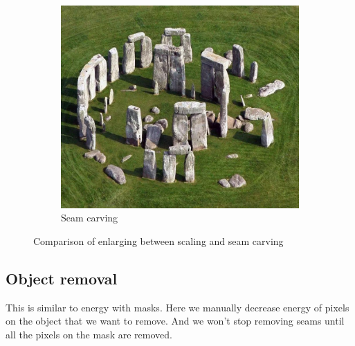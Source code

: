 \documentclass[final]{cvpr}
\begin{document}
\begin{figure}[htb]
\begin{center}
\begin{subfigure}[b]{0.40\linewidth}
    \includegraphics[width=\textwidth]{stonehenge_scale.jpg}
    \caption{Seam carving}
\end{subfigure}
\end{center}
\caption{Comparison of enlarging between scaling and seam carving}
\label{fig:stonehenge_enlarge}
\end{figure}
\subsection{Object removal}
This is similar to energy with masks.
Here we manually decrease energy of pixels on the object that we want to remove.
And we won't stop removing seams until all the pixels on the mask are removed.
\end{document}
